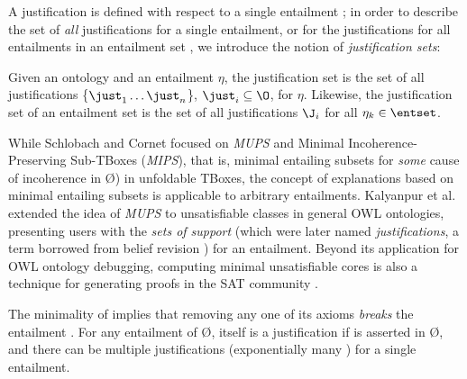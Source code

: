 A justification \justeta is defined with respect to a single entailment \ent; in order to describe the set of \emph{all} justifications for a single entailment, or for the justifications for all entailments in an entailment set \entset, we introduce the notion of \emph{justification sets}:
\begin{defn}
Given an ontology \ont and an entailment $\eta$, the justification set \justseta is the set of all justifications \{$\just_{1} \ldots \just_{n}$\}, $\just_{i} \subseteq \O$, for $\eta$. Likewise, the justification set \justs of an entailment set \entset is the set of all justifications $\J_{i}$ for all $\eta_{k} \in \entset$.
\end{defn}

While Schlobach and Cornet focused on \emph{MUPS} and Minimal Incoherence-Preserving Sub-TBoxes (\emph{MIPS}), that is, minimal entailing subsets for \emph{some} cause of incoherence in \O) in unfoldable  TBoxes, the concept of explanations based on minimal entailing subsets is applicable to arbitrary entailments. Kalyanpur et al.\ \cite{kalyanpur05mi} extended the idea of \emph{MUPS} to unsatisfiable classes in general OWL ontologies, presenting users with the \emph{sets of support} (which were later named \emph{justifications}, a term borrowed from belief revision  \cite{gardenfors88aa,nebel90dh}) for an entailment. Beyond its application for OWL ontology debugging, computing minimal unsatisfiable cores is also a technique for generating proofs in the SAT community \cite{lynce04fq}.

The minimality of \J implies that removing any one of its axioms \emph{breaks} the entailment \ent. For any entailment \ent of \O, \ent itself is a justification if \ent is asserted in \O, and there can be multiple justifications (exponentially many \cite{baader07xp}) for a single entailment. 

